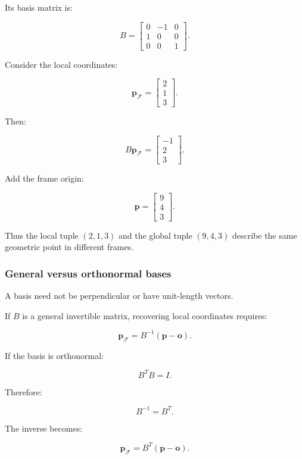 Its basis matrix is:

\[
 B= \begin{bmatrix} 0&-1&0\\ 1&0&0\\ 0&0&1 \end{bmatrix}.
\]

Consider the local coordinates:

\[
 \mathbf p_{\mathcal F}= \begin{bmatrix}2\\1\\3\end{bmatrix}.
\]

Then:

\[
 B\mathbf p_{\mathcal F} = \begin{bmatrix}-1\\2\\3\end{bmatrix}.
\]

Add the frame origin:

\[
 \boxed{ \mathbf p= \begin{bmatrix}9\\4\\3\end{bmatrix} }.
\]

Thus the local tuple \((2,1,3)\) and the global tuple \((9,4,3)\) describe the same geometric point in different frames.

\subsubsection{General versus orthonormal bases}\label{02-foundations-ii-ch032-general-versus-orthonormal-bases}

\hypertarget{02-foundations-ii-ch032-general-versus-orthonormal-bases}{}

A basis need not be perpendicular or have unit-length vectors.

If \(B\) is a general invertible matrix, recovering local coordinates requires:

\[
 \boxed{ \mathbf p_{\mathcal F} = B^{-1}(\mathbf p-\mathbf o) }.
\]

If the basis is orthonormal:

\[
 B^TB=I.
\]

Therefore:

\[
 B^{-1}=B^T.
\]

The inverse becomes:

\[
 \boxed{ \mathbf p_{\mathcal F} = B^T(\mathbf p-\mathbf o) }.
\]


